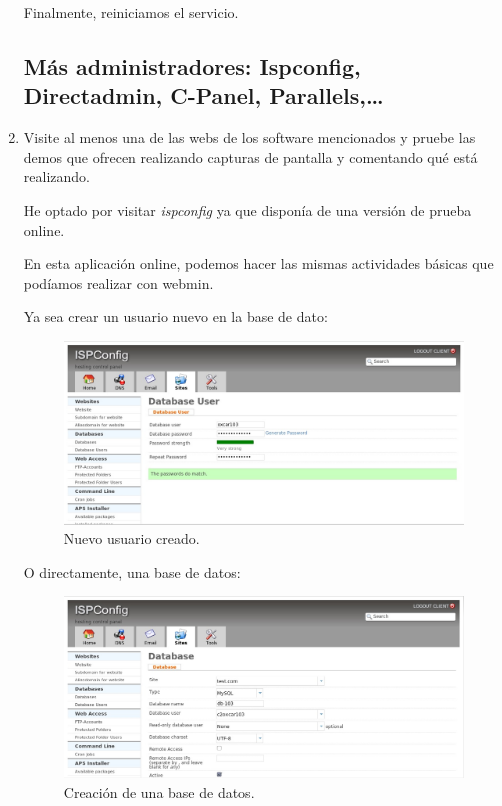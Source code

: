 \documentclass[paper=a4, fontsize=11pt]{scrartcl} %
\numberwithin{equation}{section} %
\numberwithin{figure}{section} %
\numberwithin{table}{section} %
\begin{document}
\begin{enumerate}
		Finalmente, reiniciamos el servicio.
	
	\subsection{Más administradores: Ispconfig, Directadmin, C-Panel, Parallels,\dots}
		\item Visite al menos una de las webs de los software mencionados y pruebe las demos que
		ofrecen realizando capturas de pantalla y comentando qué está realizando.
		
		He optado por visitar \textit{ispconfig}\cite{ispconfig} ya que disponía de una versión de
		prueba online.
		
		En esta aplicación online, podemos hacer las mismas actividades básicas que podíamos
		realizar con webmin.
		
		Ya sea crear un usuario nuevo en la base de dato:
		
		\begin{figure}[H]
			\centering
			\includegraphics[width=15cm]{Ejercicio_21a.jpg}
			\caption{Nuevo usuario creado.}
			\label{fig:db-user}
		\end{figure}
		
		O directamente, una base de datos:
		
		\begin{figure}[H]
			\centering
			\includegraphics[width=15cm]{Ejercicio_21b.jpg}
			\caption{Creación de una base de datos.}
			\label{fig:db}
		\end{figure}
	

\end{enumerate}
\end{document}
